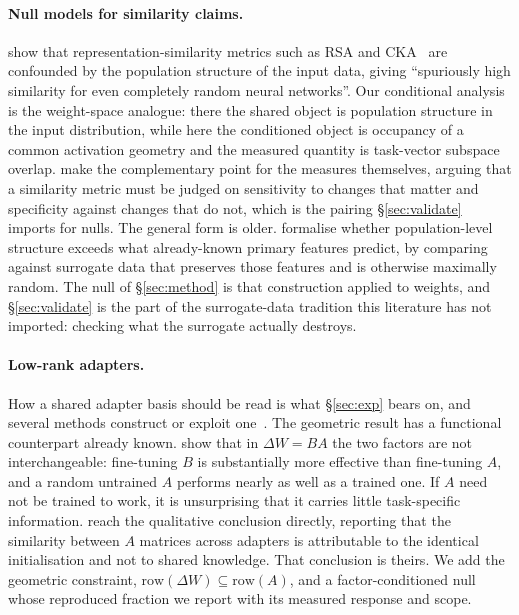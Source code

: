 \paragraph{Null models for similarity claims.}
\citet{cui2022deconfounded} show that representation-similarity metrics such as RSA and
CKA~\citep{kornblith2019similarity,raghu2017svcca} are confounded by the population structure
of the input data, giving ``spuriously high similarity for
even completely random neural networks''.
Our conditional analysis is the weight-space analogue: there the shared object is population
structure in the input distribution, while here the conditioned object is occupancy of a common
activation geometry and the measured quantity is task-vector subspace overlap.
\citet{ding2021grounding} make the complementary point for the measures themselves, arguing
that a similarity metric must be judged on sensitivity to changes that matter and specificity
against changes that do not, which is the pairing \S\ref{sec:validate} imports for nulls.
The general form is older. \citet{elsayed2017structure} formalise whether population-level
structure exceeds what already-known primary features predict, by comparing against surrogate
data that preserves those features and is otherwise maximally random.
The null of \S\ref{sec:method} is that construction applied to weights, and \S\ref{sec:validate}
is the part of the surrogate-data tradition this literature has not imported: checking what the
surrogate actually destroys.

\paragraph{Low-rank adapters.}
How a shared adapter basis should be read is what \S\ref{sec:exp} bears on, and several
methods construct or exploit one~\citep{stoica2025knots,panariello2025corespace,zeng2026tvbases}.
The geometric result has a functional counterpart already known.
\citet{zhu2024asymmetry} show that in $\Delta W = BA$ the two factors are not interchangeable:
fine-tuning $B$ is substantially more effective than fine-tuning $A$, and a random untrained $A$
performs nearly as well as a trained one.
If $A$ need not be trained to work, it is unsurprising that it carries little task-specific
information.
\citet{ban2026rethinking} reach the qualitative conclusion directly, reporting that the
similarity between $A$ matrices across adapters is attributable to the identical
initialisation and not to shared knowledge. That conclusion is theirs.
We add the geometric constraint, $\mathrm{row}(\Delta W) \subseteq \mathrm{row}(A)$, and a
factor-conditioned null whose reproduced fraction we report with its measured response and scope.
